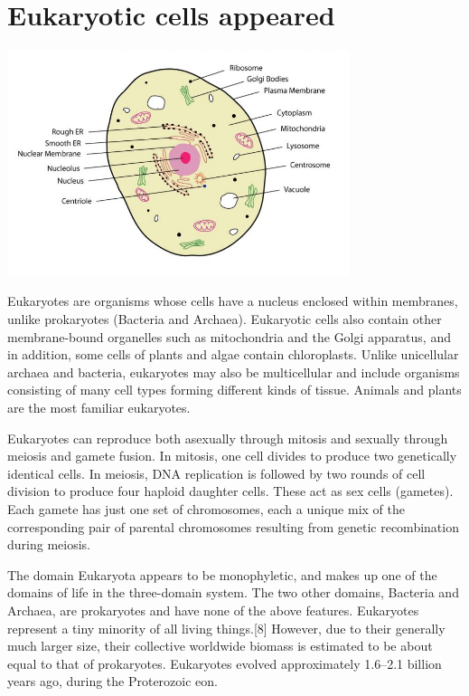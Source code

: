 \documentclass[11pt]{report}
\begin{document}
\section{Eukaryotic cells appeared}
\vspace{2mm}\begin{center}\includegraphics[width=10cm]{./img/eukaryoticCell.jpg}\end{center}
Eukaryotes are organisms whose cells have a nucleus enclosed within membranes, unlike prokaryotes (Bacteria and Archaea). Eukaryotic cells also contain other membrane-bound organelles such as mitochondria and the Golgi apparatus, and in addition, some cells of plants and algae contain chloroplasts. Unlike unicellular archaea and bacteria, eukaryotes may also be multicellular and include organisms consisting of many cell types forming different kinds of tissue. Animals and plants are the most familiar eukaryotes.

Eukaryotes can reproduce both asexually through mitosis and sexually through meiosis and gamete fusion. In mitosis, one cell divides to produce two genetically identical cells. In meiosis, DNA replication is followed by two rounds of cell division to produce four haploid daughter cells. These act as sex cells (gametes). Each gamete has just one set of chromosomes, each a unique mix of the corresponding pair of parental chromosomes resulting from genetic recombination during meiosis.

The domain Eukaryota appears to be monophyletic, and makes up one of the domains of life in the three-domain system. The two other domains, Bacteria and Archaea, are prokaryotes and have none of the above features. Eukaryotes represent a tiny minority of all living things.[8] However, due to their generally much larger size, their collective worldwide biomass is estimated to be about equal to that of prokaryotes. Eukaryotes evolved approximately 1.6–2.1 billion years ago, during the Proterozoic eon.
\end{document}
